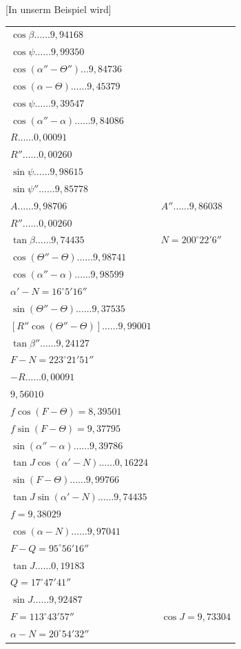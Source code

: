 \documentclass[12pt,a4paper]{article}
\begin{document}
[In unserm Beispiel wird]
\begin{center}
\begin{tabular}{ll}
$\cos\beta \ldots\ldots 9{,}94168$ & \\
$\cos\psi \ldots\ldots 9{,}99350$ & \\
$\cos(\alpha'' - \Theta'') \ldots 9{,}84736$ & \\
$\cos(\alpha - \Theta) \ldots\ldots 9{,}45379$ & \\
$\cos\psi \ldots\ldots 9{,}39547$ & \\
$\cos(\alpha'' - \alpha) \ldots\ldots 9{,}84086$ & \\
$R \ldots\ldots 0{,}00091$ & \\
$R'' \ldots\ldots 0{,}00260$ & \\
$\sin\psi \ldots\ldots 9{,}98615$ & \\
$\sin\psi'' \ldots\ldots 9{,}85778$ & \\
$A \ldots\ldots 9{,}98706$ & $A'' \ldots\ldots 9{,}86038$ \\
$R'' \ldots\ldots 0{,}00260$ & \\
$\tan\beta \ldots\ldots 9{,}74435$ & $N = 200^\circ 22' 6''$ \\
$\cos(\Theta'' - \Theta) \ldots\ldots 9{,}98741$ & \\
$\cos(\alpha'' - \alpha) \ldots\ldots 9{,}98599$ & \\
$\alpha' - N = 16^\circ 5' 16''$ & \\
$\sin(\Theta'' - \Theta) \ldots\ldots 9{,}37535$ & \\
$[R''\cos(\Theta'' - \Theta)] \ldots\ldots 9{,}99001$ & \\
$\tan\beta'' \ldots\ldots 9{,}24127$ & \\
$F - N = 223^\circ 21' 51''$ & \\
$-R \ldots\ldots 0{,}00091$ & \\
$9{,}56010$ & \\
$f\cos(F - \Theta) = 8{,}39501$ & \\
$f\sin(F - \Theta) = 9{,}37795$ & \\
$\sin(\alpha'' - \alpha) \ldots\ldots 9{,}39786$ & \\
$\tan J \cos(\alpha' - N) \ldots\ldots 0{,}16224$ & \\
$\sin(F - \Theta) \ldots\ldots 9{,}99766$ & \\
$\tan J \sin(\alpha' - N) \ldots\ldots 9{,}74435$ & \\
$f = 9{,}38029$ & \\
$\cos(\alpha - N) \ldots\ldots 9{,}97041$ & \\
$F - Q = 95^\circ 56' 16''$ & \\
$\tan J \ldots\ldots 0{,}19183$ & \\
$Q = 17^\circ 47' 41''$ & \\
$\sin J \ldots\ldots 9{,}92487$ & \\
$F = 113^\circ 43' 57''$ & $\cos J = 9{,}73304$ \\
$\alpha - N = 20^\circ 54' 32''$ & \\
\end{tabular}
\end{center}
\end{document}
